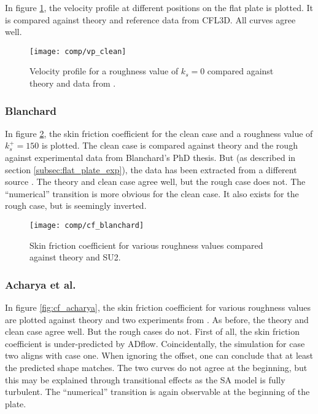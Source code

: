 \noindent In figure \ref{fig:vp_clean}, the velocity profile at different
positions on the flat plate is plotted. It is compared against theory and
reference data from CFL3D. All curves agree well.
\begin{figure}[H] \centering
  \texttt{[image: comp/vp\_clean]}
    \caption{Velocity profile for a roughness value of $k_{s} = 0$ compared
      against theory and  data from \cite{rumsey_flat}.}
    \label{fig:vp_clean}
\end{figure}

\subsubsection{Blanchard}
In figure \ref{fig:cf_blanchard}, the skin friction coefficient for the clean
case and a roughness value of $k_{s}^{+} = 150$ is plotted. The clean case is
compared against theory and the rough against experimental data from Blanchard's
PhD thesis. But (as described in section \ref{subsec:flat_plate_exp}), the data
has been extracted from a different source \cite{sa_rough}. The theory and clean
case agree well, but the rough case does not. The ``numerical'' transition is
more obvious for the clean case. It also exists for the rough case, but is
seemingly inverted.

\begin{figure}[H] \centering
  \texttt{[image: comp/cf\_blanchard]}
    \caption{Skin friction coefficient for various roughness values compared
      against theory and SU2.}
    \label{fig:cf_blanchard}
\end{figure}


\subsubsection{Acharya et al.}
In figure \ref{fig:cf_acharya}, the skin friction coefficient for various
roughness values are plotted against theory and two experiments from
\cite{Acharya1986}. As before, the theory and clean case agree well. But the
rough cases do not. First of all, the skin friction coefficient is
under-predicted by ADflow. Coincidentally, the simulation for case two aligns
with case one. When ignoring the offset, one can conclude that at least the
predicted shape matches. The two curves do not agree at the beginning, but this
may be explained through transitional effects as the SA model is fully
turbulent. The ``numerical'' transition is again observable at the beginning of
the plate.

